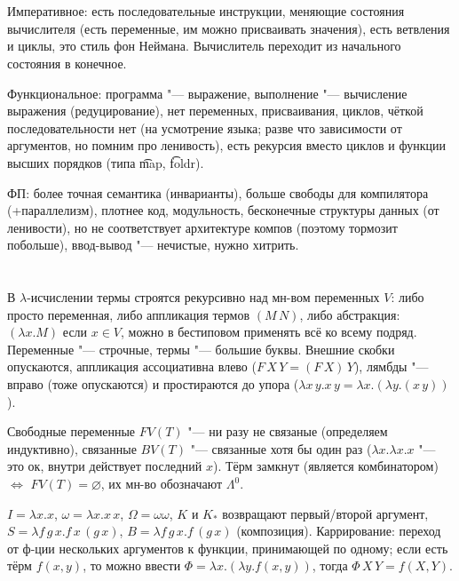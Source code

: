 \section{} %
Императивное: есть последовательные инструкции, меняющие состояния вычислителя
(есть переменные, им можно присваивать значения), есть ветвления и циклы, это
стиль фон Неймана.
Вычислитель переходит из начального состояния в конечное.

Функциональное: программа "--- выражение, выполнение "--- вычисление выражения (редуцирование),
нет переменных, присваивания, циклов, чёткой последовательности нет (на усмотрение языка; разве что зависимости
от аргументов, но помним про ленивость), есть рекурсия вместо циклов и функции высших порядков
(типа \t{map}, \t{foldr}).

ФП: более точная семантика (инварианты), больше свободы для компилятора (+параллелизм), плотнее код,
модульность, бесконечные структуры данных (от ленивости), но не соответствует архитектуре компов
(поэтому тормозит побольше), ввод-вывод "--- нечистые, нужно хитрить.

\section{} %
В $\lambda$-исчислении термы строятся рекурсивно над мн-вом переменных $V$:
либо просто переменная, либо аппликация термов $(M\, N)$, либо абстракция: $(\lambda x . M)$ если $x \in V$,
можно в бестиповом применять всё ко всему подряд.
Переменные "--- строчные, термы "--- большие буквы.
Внешние скобки опускаются, аппликация ассоциативна влево ($F\,X\,Y=(F\,X)\,Y$),
лямбды "--- вправо (тоже опускаются) и простираются до упора
($\lambda x\, y . x\, y = \lambda x . (\lambda y . (x\, y))$).

Свободные переменные $FV(T)$ "--- ни разу не связаные (определяем индуктивно),
связанные $BV(T)$ "--- связанные хотя бы один раз ($\lambda x . \lambda x . x$ "--- это ок,
внутри действует последний $x$).
Тёрм замкнут (является комбинатором) $\iff$ $FV(T)=\varnothing$, их мн-во обозначают $\Lambda^0$.

$I=\lambda x.x$, $\omega = \lambda x.x\, x$, $\Omega = \omega \omega$, $K$ и $K_*$ возвращают первый/второй аргумент,
$S=\lambda f\,g\,x.f\,x\,(g\,x)$, $B=\lambda f\,g\,x.f\,(g\,x)$ (композиция).
Каррирование: переход от ф-ции нескольких аргументов к функции, принимающей по одному;
если есть тёрм $f(x, y)$, то можно ввести $\Phi=\lambda x . (\lambda y . f(x, y))$,
тогда $\Phi\, X\, Y = f(X, Y)$.


